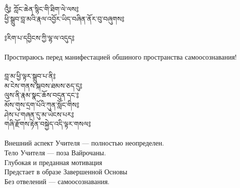 
\normalsize
{}

{\ti འུྃ༔ ཀློང་ཆེན་སྙིང་གི་ཐིག་ལེ་ལས༔\\
ཕྱི་སྒྲུབ་བླ་མའི་རྣལ་འབྱོར་ཡིད་བཞིན་ནོར་བུ་བཞུགས༔}\\
\\

{\ti ༔རིག་པ་དབྱིངས་ཀྱི་ལྷ་ལ་འདུད༔}\\
\\
\ru Простираюсь перед манифестацией обшиного пространства самоосознавания!\\
\\
{\ti བླ་མ་ཕྱི་ལྟར་སྒྲུབ་པ་ནི༔\\
མ་ངེས་གནས་སྐབས་ཐམས་ཅད་དུ༔\\
ལུས་ནི་རྣམ་སྣང་ཆོས་བདུན་དང་༔\\
མོས་གུས་དྲག་པོའི་ཀུན་སློང་གིས༔\\
ཤེས་པ་གཞན་དུ་མ་ཡེངས་པར༔\\
གཞི་རྫོགས་རྟེན་བསྐྱེད་འདི་ལྟར་གསལ༔}\\
\\
\ru Внешний аспект Учителя — полностью неопределен.\\
Тело Учителя — поза Вайрочаны.\\
Глубокая и преданная мотивация\\
Предстает в образе Завершенной Основы\\
Без отвелений — самоосознавания.\\
\\

